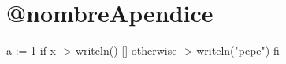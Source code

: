 \chapter{@nombreApendice}
\label{apendiceB}

\begin{gracielacode}
a := 1
if x -> writeln()
[] otherwise -> writeln("pepe")
fi
\end{gracielacode}
